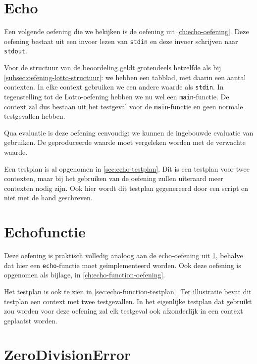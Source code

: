 \inputminted[firstline=6,lastline=50,gobble=8]{json}{sources/lotto-plan.tson}

\section{Echo}\label{sec:oefening-echo}

Een volgende oefening die we bekijken is de oefening uit \cref{ch:echo-oefening}.
Deze oefening bestaat uit een invoer lezen van \texttt{stdin} en deze invoer schrijven naar \texttt{stdout}.

Voor de structuur van de beoordeling geldt grotendeels hetzelfde als bij \cref{subsec:oefening-lotto-structuur}: we hebben een tabblad, met daarin een aantal contexten.
In elke context gebruiken we een andere waarde als \texttt{stdin}.
In tegenstelling tot de Lotto-oefening hebben we nu wel een \texttt{main}-functie.
De context zal dus bestaan uit het testgeval voor de \texttt{main}-functie en geen normale testgevallen hebben.

Qua evaluatie is deze oefening eenvoudig: we kunnen de ingebouwde evaluatie van \tested{} gebruiken.
De geproduceerde waarde moet vergeleken worden met de verwachte waarde.

Een testplan is al opgenomen in \cref{sec:echo-testplan}.
Dit is een testplan voor twee contexten, maar bij het gebruiken van de oefening zullen uiteraard meer contexten nodig zijn.
Ook hier wordt dit testplan gegenereerd door een script en niet met de hand geschreven.

\section{Echofunctie}\label{sec:oefening-echofunctie}

Deze oefening is praktisch volledig analoog aan de echo-oefening uit \cref{sec:oefening-echo}, behalve dat hier een \texttt{echo}-functie moet geïmplementeerd worden.
Ook deze oefening is opgenomen als bijlage, in \cref{ch:echo-function-oefening}.

Het testplan is ook te zien in \cref{sec:echo-function-testplan}.
Ter illustratie bevat dit testplan een context met twee testgevallen.
In het eigenlijke testplan dat gebruikt zou worden voor deze oefening zal elk testgeval ook afzonderlijk in een context geplaatst worden.

\section{ZeroDivisionError}\label{sec:oefening-zero}

